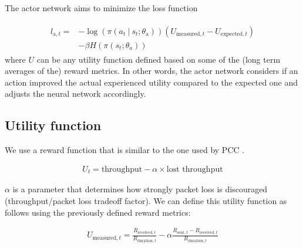 \documentclass[newfonts=false,format=sigconf,10pt,letterpaper]{acmart}
\newcommand\givenbase[1][]{\:#1\lvert\:}
\let\given\givenbase
\begin{document}
The actor network aims to minimize the loss function

\begin{align}
\begin{split}
l_{\text{a},t} =& -\log \left( \pi \left( a_t \given s_t ; \theta_\text{a} \right) \right)\left( U_{\text{measured},t} - U_{\text{expected},t} \right)\\ 
&- \beta H\left( \pi\left( s_t; \theta_a \right)\right)
\end{split}
\end{align}
where $U$ can be any utility function defined based on some of the (long term averages of the) reward metrics. In other words, the actor network considers if an action improved the actual experienced utility compared to the expected one and adjusts the neural network accordingly.
 
\subsection{Utility function}
\label{subsec:utility}


We use a reward function that is similar to the one used by PCC \cite{dong_pcc:_2015}.

\begin{align}
U_t = \text{throughput} - \alpha \times \text{lost throughput}
\end{align}

$\alpha$ is a parameter that determines how strongly packet loss is discouraged (throughput/packet loss tradeoff factor). We can define this utility function as follows using the previously defined reward metrics: 

\begin{align}
U_{\text{measured},t} = \frac{R_{\text{received},t}}{R_{\text{duration},t}} - \alpha \frac{R_{\text{sent},t} - R_{\text{received},t}}{R_{\text{duration},t}}
\end{align}
\end{document}
